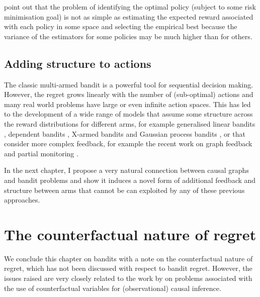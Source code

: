 \documentclass[11pt,a4paper,twoside]{report}
\theoremstyle{plain}
\theoremstyle{definition}
\begin{document}
\citet{Swaminathan2015} point out that the problem of identifying the optimal policy (subject to some risk minimisation goal) is not as simple as estimating the expected reward associated with each policy in some space and selecting the empirical best because the variance of the estimators for some policies may be much higher than for others.

\subsection{Adding structure to actions}
\label{sec:adding-structure-bandit-actions}

The classic multi-armed bandit is a powerful tool for sequential decision making. However, the regret grows linearly with the number of (sub-optimal) actions and many real world problems have large or even infinite action spaces. This has led to the development of a wide range of models that assume some structure across the reward distributions for different arms, for example generalised linear bandits \citep{filippi2010parametric}, dependent bandits \citep{Pandey2007}, X-armed bandits \citep{Bubeck2010} and Gaussian process bandits \citep{srinivas2009gaussian}, or that consider more complex feedback, for example the recent work on graph feedback\citep{Mannor2011,Lelarge2012,Alon2013,Buccapatnam2014,Kocak2014,Alon2015} and partial monitoring \citep{Piccolboni2001,Bartok2014}.

In the next chapter, I propose a very natural connection between causal graphs and bandit problems and show it induces a novel form of additional feedback and structure between arms that cannot be can exploited by any of these previous approaches. 

\section{The counterfactual nature of regret}
\label{sec:counterfactual-nature-regret}

We conclude this chapter on bandits with a note on the counterfactual nature of regret, which has not been discussed with respect to bandit regret. However, the issues raised are very closely related to the work by \citet{Dawid2000} on problems associated with the use of counterfactual variables for (observational) causal inference.
\end{document}
